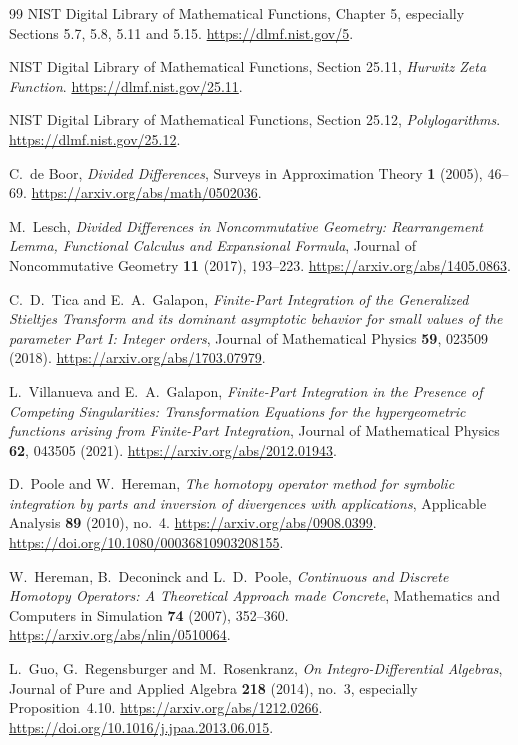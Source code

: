 \begin{thebibliography}{99}
NIST Digital Library of Mathematical Functions,
Chapter 5, especially Sections 5.7, 5.8, 5.11 and 5.15.
\url{https://dlmf.nist.gov/5}.

NIST Digital Library of Mathematical Functions,
Section 25.11, \emph{Hurwitz Zeta Function}.
\url{https://dlmf.nist.gov/25.11}.

NIST Digital Library of Mathematical Functions,
Section 25.12, \emph{Polylogarithms}.
\url{https://dlmf.nist.gov/25.12}.

C.~de Boor, \emph{Divided Differences},
Surveys in Approximation Theory \textbf{1} (2005), 46--69.
\url{https://arxiv.org/abs/math/0502036}.

M.~Lesch, \emph{Divided Differences in Noncommutative Geometry:
Rearrangement Lemma, Functional Calculus and Expansional Formula},
Journal of Noncommutative Geometry \textbf{11} (2017), 193--223.
\url{https://arxiv.org/abs/1405.0863}.

C.~D.~Tica and E.~A.~Galapon,
\emph{Finite-Part Integration of the Generalized Stieltjes Transform
and its dominant asymptotic behavior for small values of the parameter
Part I: Integer orders}, Journal of Mathematical Physics
\textbf{59}, 023509 (2018).
\url{https://arxiv.org/abs/1703.07979}.

L.~Villanueva and E.~A.~Galapon,
\emph{Finite-Part Integration in the Presence of Competing Singularities:
Transformation Equations for the hypergeometric functions arising from
Finite-Part Integration}, Journal of Mathematical Physics
\textbf{62}, 043505 (2021).
\url{https://arxiv.org/abs/2012.01943}.

D.~Poole and W.~Hereman,
\emph{The homotopy operator method for symbolic integration by parts
and inversion of divergences with applications},
Applicable Analysis \textbf{89} (2010), no.~4.
\url{https://arxiv.org/abs/0908.0399}.
\url{https://doi.org/10.1080/00036810903208155}.

W.~Hereman, B.~Deconinck and L.~D.~Poole,
\emph{Continuous and Discrete Homotopy Operators:
A Theoretical Approach made Concrete},
Mathematics and Computers in Simulation \textbf{74} (2007), 352--360.
\url{https://arxiv.org/abs/nlin/0510064}.

L.~Guo, G.~Regensburger and M.~Rosenkranz,
\emph{On Integro-Differential Algebras},
Journal of Pure and Applied Algebra \textbf{218} (2014), no.~3,
especially Proposition~4.10.
\url{https://arxiv.org/abs/1212.0266}.
\url{https://doi.org/10.1016/j.jpaa.2013.06.015}.

\end{thebibliography}

